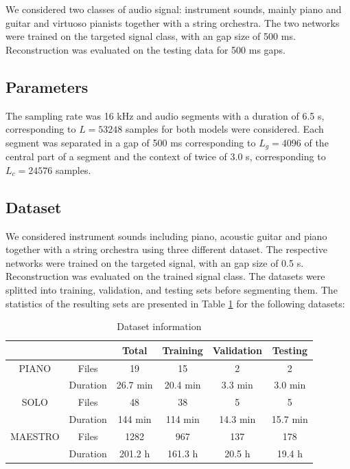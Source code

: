\documentclass{article} %
\begin{document}
We considered two classes of audio signal: instrument sounds, mainly piano and guitar and virtuoso pianists together with a string orchestra. The two networks were trained on the targeted signal class, with an gap size of 500 ms. Reconstruction was evaluated on the testing data for 500 ms gaps. 


\subsection{Parameters}
The sampling rate was 16 kHz and audio segments with a duration of 6.5 s, corresponding to $L=53248$ samples for both models were considered. Each segment was separated in a gap of 500 ms corresponding to $L_g=4096$ of the central part of a segment and the context of twice of 3.0 s, corresponding to $L_c=24576$ samples.


\subsection{Dataset}\label{subsec:Dataset}
We considered instrument sounds including piano, acoustic guitar and piano together with a string orchestra using three different dataset. The respective networks were trained on the targeted signal, with an gap size of 0.5 s. Reconstruction was evaluated on the trained signal class. The datasets were splitted into training, validation, and testing sets before segmenting them. The statistics of the resulting sets are presented in Table \ref{tab:maestro} for the following datasets:

\begin{table}[ht]
    \centering
    \begin{tabular}{c|c|c|c|c|c}
        \hline
         &      & Total & Training & Validation & Testing \\
        \hline
        PIANO   & Files     & 19 & 15 & 2 & 2 \\
                & Duration  & 26.7 min & 20.4 min & 3.3 min & 3.0 min \\
        \hline
        SOLO    & Files     & 48 & 38 & 5 & 5 \\
                & Duration  & 144 min & 114 min & 14.3 min & 15.7 min\\
        \hline
        MAESTRO & Files     & 1282 & 967 & 137 & 178 \\
                & Duration  & 201.2 h & 161.3 h & 20.5 h & 19.4 h \\
        \hline
    \end{tabular}
    \caption{Dataset information}
    \label{tab:maestro}
\end{table}
\end{document}
